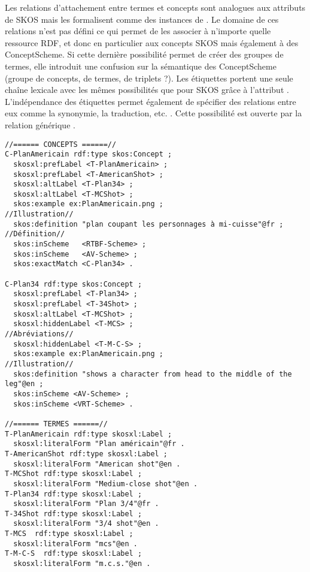 Les relations d'attachement entre termes et concepts sont analogues aux attributs de SKOS mais les formalisent comme des instances de . 
Le domaine de ces relations n'est pas défini ce qui permet de les associer à n'importe quelle ressource RDF, et donc en particulier aux concepts SKOS mais également à des ConceptScheme. 
Si cette dernière possibilité permet de créer des groupes de termes, elle introduit une confusion sur la sémantique des ConceptScheme (groupe de concepts, de termes, de triplets ?). 
Les étiquettes portent une seule chaîne lexicale avec les mêmes possibilités que pour SKOS grâce à l'attribut . 
L'indépendance des étiquettes permet également de spécifier des relations entre eux comme la synonymie, la traduction, etc. \cite{Pastor2009a}. 
Cette possibilité est ouverte par la relation générique . 


\begin{Verbatim}[fontsize=\small,formatcom=\color{black!70}]
//====== CONCEPTS ======//
C-PlanAmericain rdf:type skos:Concept ; 
  skosxl:prefLabel <T-PlanAmericain> ;
  skosxl:prefLabel <T-AmericanShot> ;
  skosxl:altLabel <T-Plan34> ;
  skosxl:altLabel <T-MCShot> ;
  skos:example ex:PlanAmericain.png ;                               //Illustration//
  skos:definition "plan coupant les personnages à mi-cuisse"@fr ;   //Définition//
  skos:inScheme   <RTBF-Scheme> ;
  skos:inScheme   <AV-Scheme> ;
  skos:exactMatch <C-Plan34> .

C-Plan34 rdf:type skos:Concept ;
  skosxl:prefLabel <T-Plan34> ;
  skosxl:prefLabel <T-34Shot> ;
  skosxl:altLabel <T-MCShot> ;
  skosxl:hiddenLabel <T-MCS> ;                                           //Abréviations//
  skosxl:hiddenLabel <T-M-C-S> ;
  skos:example ex:PlanAmericain.png ;                                   //Illustration//
  skos:definition "shows a character from head to the middle of the leg"@en ;
  skos:inScheme <AV-Scheme> ;
  skos:inScheme <VRT-Scheme> .

//====== TERMES ======//
T-PlanAmericain rdf:type skosxl:Label ;
  skosxl:literalForm "Plan américain"@fr .
T-AmericanShot rdf:type skosxl:Label ;
  skosxl:literalForm "American shot"@en .
T-MCShot rdf:type skosxl:Label ;
  skosxl:literalForm "Medium-close shot"@en .
T-Plan34 rdf:type skosxl:Label ;
  skosxl:literalForm "Plan 3/4"@fr .
T-34Shot rdf:type skosxl:Label ;
  skosxl:literalForm "3/4 shot"@en .
T-MCS  rdf:type skosxl:Label ;
  skosxl:literalForm "mcs"@en .
T-M-C-S  rdf:type skosxl:Label ;
  skosxl:literalForm "m.c.s."@en .
\end{Verbatim}



